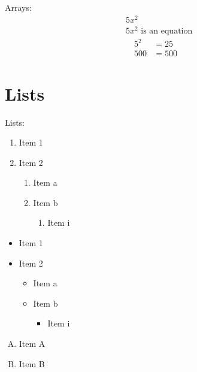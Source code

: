 \documentclass[12pt]{article}
\begin{document}
Arrays: \\[5pt]
\begin{align} %
    &5x^2 \\
    &5x^2 \text{ is an equation}
\end{align}
\begin{align}
    5^2&=25 \\
    500&=500
\end{align} \vspace{10pt}


\section{Lists}

Lists: 
\begin{enumerate}
    \item Item 1
    \item Item 2
        \begin{enumerate}
            \item Item a
            \item Item b
            \begin{enumerate}
                \item Item i
            \end{enumerate}
        \end{enumerate}
\end{enumerate} \vspace{10pt}

\begin{itemize}
    \item Item 1
    \item Item 2
    \begin{itemize}
        \item Item a
        \item Item b
        \begin{itemize}
            \item Item i
        \end{itemize}
    \end{itemize}
\end{itemize} \vspace{10pt}

\begin{enumerate}[A.]
    \item Item A
    \item Item B
\end{enumerate} \vspace{10pt}
\end{document}
